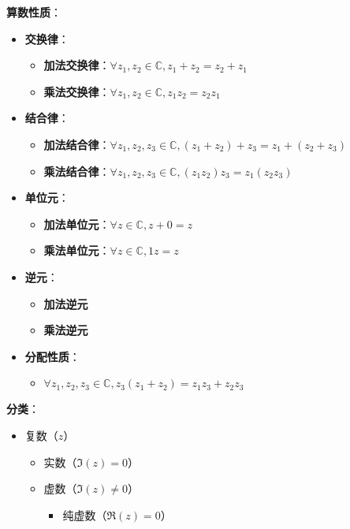 \documentclass[
]{article}
\begin{document}
\textbf{算数性质}：

\begin{itemize}
\item
  \textbf{交换律}：

  \begin{itemize}
  \item
    \textbf{加法交换律}：\(\forall z_1, z_2 \in \mathbb C, z_1 + z_2 = z_2 + z_1\)
  \item
    \textbf{乘法交换律}：\(\forall z_1, z_2 \in \mathbb C, z_1 z_2 = z_2 z_1\)
  \end{itemize}
\item
  \textbf{结合律}：

  \begin{itemize}
  \item
    \textbf{加法结合律}：\(\forall z_1, z_2, z_3 \in \mathbb C, (z_1 + z_2)+ z_3 = z_1 + (z_2 + z_3)\)
  \item
    \textbf{乘法结合律}：\(\forall z_1, z_2, z_3 \in \mathbb C, (z_1 z_2)z_3 = z_1(z_2 z_3)\)
  \end{itemize}
\item
  \textbf{单位元}：

  \begin{itemize}
  \item
    \textbf{加法单位元}：\(\forall z \in \mathbb C, z + 0 = z\)
  \item
    \textbf{乘法单位元}：\(\forall z \in \mathbb C, 1z = z\)
  \end{itemize}
\item
  \textbf{逆元}：

  \begin{itemize}
  \item
    \textbf{加法逆元}
  \item
    \textbf{乘法逆元}
  \end{itemize}
\item
  \textbf{分配性质}：

  \begin{itemize}
  \item
    \(\forall z_1, z_2, z_3 \in \mathbb C, z_3 (z_1 + z_2)= z_1 z_3 + z_2 z_3\)
  \end{itemize}
\end{itemize}

\textbf{分类}：

\begin{itemize}
\item
  复数（\(z\)）

  \begin{itemize}
  \item
    实数（\(\Im(z) = 0\)）
  \item
    虚数（\(\Im(z) \neq 0\)）

    \begin{itemize}
    \item
      纯虚数（\(\Re(z) = 0\)）
    \end{itemize}
  \end{itemize}
\end{itemize}
\end{document}
